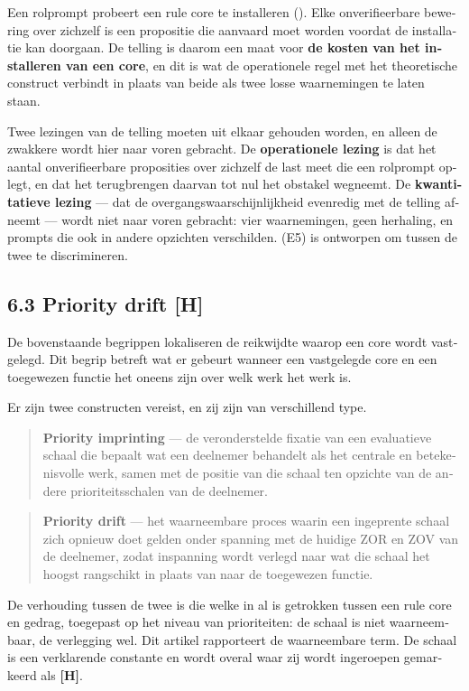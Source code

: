 \begin{dutch}
Een rolprompt probeert een rule core te installeren (). Elke onverifieerbare bewering over zichzelf is een propositie die aanvaard moet worden voordat de installatie kan doorgaan. De telling is daarom een maat voor \textbf{de kosten van het installeren van een core}, en dit is wat de operationele regel met het theoretische construct verbindt in plaats van beide als twee losse waarnemingen te laten staan.

Twee lezingen van de telling moeten uit elkaar gehouden worden, en alleen de zwakkere wordt hier naar voren gebracht. De \textbf{operationele lezing} is dat het aantal onverifieerbare proposities over zichzelf de last meet die een rolprompt oplegt, en dat het terugbrengen daarvan tot nul het obstakel wegneemt. De \textbf{kwantitatieve lezing} — dat de overgangswaarschijnlijkheid evenredig met de telling afneemt — wordt niet naar voren gebracht: vier waarnemingen, geen herhaling, en prompts die ook in andere opzichten verschilden.  (E5) is ontworpen om tussen de twee te discrimineren.


\subsection*{6.3 Priority drift \textbf{[H]}}
\label{sec:nl:6.3}

De bovenstaande begrippen lokaliseren de reikwijdte waarop een core wordt vastgelegd. Dit begrip betreft wat er gebeurt wanneer een vastgelegde core en een toegewezen functie het oneens zijn over welk werk het werk is.

Er zijn twee constructen vereist, en zij zijn van verschillend type.

\begin{quote}
\textbf{Priority imprinting} — de veronderstelde fixatie van een evaluatieve schaal die bepaalt wat een deelnemer behandelt als het centrale en betekenisvolle werk, samen met de positie van die schaal ten opzichte van de andere prioriteitsschalen van de deelnemer.
\end{quote}
\begin{quote}
\textbf{Priority drift} — het waarneembare proces waarin een ingeprente schaal zich opnieuw doet gelden onder spanning met de huidige ZOR en ZOV van de deelnemer, zodat inspanning wordt verlegd naar wat die schaal het hoogst rangschikt in plaats van naar de toegewezen functie.
\end{quote}
De verhouding tussen de twee is die welke in  al is getrokken tussen een rule core en gedrag, toegepast op het niveau van prioriteiten: de schaal is niet waarneembaar, de verlegging wel. Dit artikel rapporteert de waarneembare term. De schaal is een verklarende constante en wordt overal waar zij wordt ingeroepen gemarkeerd als \textbf{[H]}.


\end{dutch}

